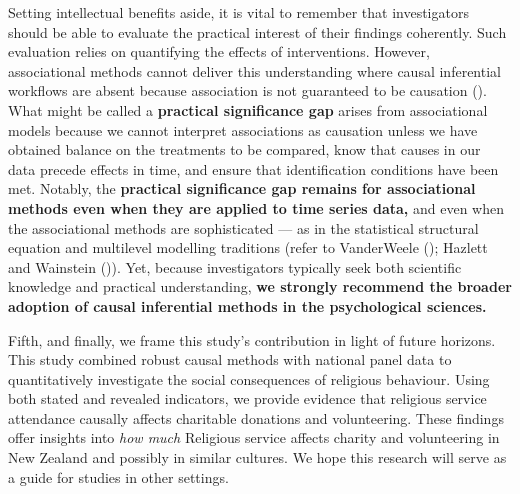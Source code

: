 \documentclass[
  single column]{article}
\begin{document}
Setting intellectual benefits aside, it is vital to remember that
investigators should be able to evaluate the practical interest of their
findings coherently. Such evaluation relies on quantifying the effects
of interventions. However, associational methods cannot deliver this
understanding where causal inferential workflows are absent because
association is not guaranteed to be causation
(). What might
be called a \textbf{practical significance gap} arises from
associational models because we cannot interpret associations as
causation unless we have obtained balance on the treatments to be
compared, know that causes in our data precede effects in time, and
ensure that identification conditions have been met. Notably, the
\textbf{practical significance gap remains for associational methods
even when they are applied to time series data,} and even when the
associational methods are sophisticated --- as in the statistical
structural equation and multilevel modelling traditions (refer to
VanderWeele (); Hazlett and
Wainstein ()). Yet, because
investigators typically seek both scientific knowledge and practical
understanding, \textbf{we strongly recommend the broader adoption of
causal inferential methods in the psychological sciences.}

Fifth, and finally, we frame this study's contribution in light of
future horizons. This study combined robust causal methods with national
panel data to quantitatively investigate the social consequences of
religious behaviour. Using both stated and revealed indicators, we
provide evidence that religious service attendance causally affects
charitable donations and volunteering. These findings offer insights
into \emph{how much} Religious service affects charity and volunteering
in New Zealand and possibly in similar cultures. We hope this research
will serve as a guide for studies in other settings.
\end{document}
